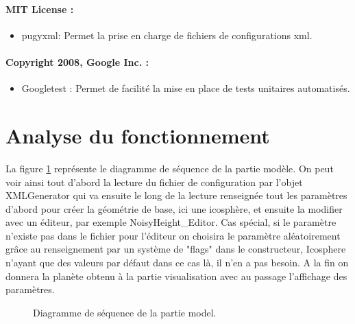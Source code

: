 \documentclass[a4paper]{article}
\begin{document}
\paragraph{MIT License :}
\begin{itemize}
\item pugyxml:
    Permet la prise en charge de fichiers de configurations xml.
\end{itemize}

\paragraph{Copyright 2008, Google Inc. :}
\begin{itemize}
\item Googletest :
    Permet de facilité la mise en place de tests unitaires automatisés. 
\end{itemize}

\newpage 
\section{Analyse du fonctionnement}

La figure \ref{seqmodel} représente le diagramme de séquence de la partie modèle. 
On peut voir ainsi tout d'abord la lecture du fichier de configuration par l'objet XMLGenerator qui va ensuite le long de la lecture renseignée tout les paramètres d'abord pour créer la géométrie de base, ici une icosphère, et ensuite la modifier avec un éditeur, par exemple NoisyHeight\_Editor. Cas spécial, si le paramètre n'existe pas dans le fichier pour l'éditeur on choisira le paramètre aléatoirement grâce au renseignement par un système de "flags" dans le constructeur, Icosphere n'ayant que des valeurs par défaut dans ce cas là, il n'en a pas besoin. A la fin on donnera la planète obtenu à la partie visualisation avec au passage l'affichage des paramètres.\\

\begin{figure}[!ht]
\centering
\caption{Diagramme de séquence de la partie model.}
\label{seqmodel}
\end{figure}
\end{document}
